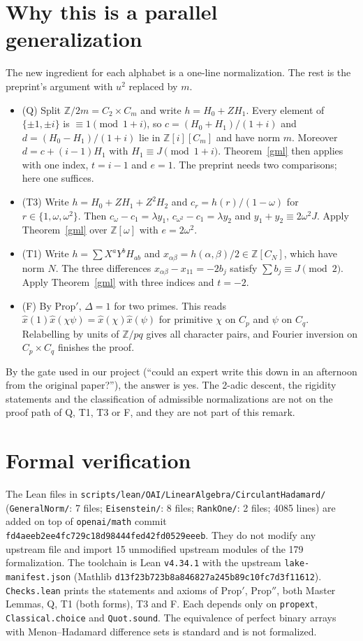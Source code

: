 \documentclass[11pt]{amsart}
\theoremstyle{remark}
\newcommand{\Z}{\mathbb{Z}}
\begin{document}
\section{Why this is a parallel generalization}
The new ingredient for each alphabet is a one-line normalization. The rest is the
preprint's argument with $u^2$ replaced by $m$.
\begin{itemize}
\item (Q) Split $\Z/2m=C_2\times C_m$ and write $h=H_0+ZH_1$. Every element of
$\{\pm1,\pm i\}$ is $\equiv1\pmod{1+i}$, so $c=(H_0+H_1)/(1+i)$ and
$d=(H_0-H_1)/(1+i)$ lie in $\Z[i][C_m]$ and have norm $m$. Moreover $d=c+(i-1)H_1$ with
$H_1\equiv J\pmod{1+i}$. Theorem~\ref{gml} then applies with one index, $t=i-1$ and $e=1$. The
preprint needs two comparisons; here one suffices.
\item (T3) Write $h=H_0+ZH_1+Z^2H_2$ and $c_r=h(r)/(1-\omega)$ for $r\in\{1,\omega,\omega^2\}$.
Then $c_\omega-c_1=\lambda y_1$, $c_{\omega^2}-c_1=\lambda y_2$ and $y_1+y_2\equiv2\omega^2J$.
Apply Theorem~\ref{gml} over $\Z[\omega]$ with $e=2\omega^2$.
\item (T1) Write $h=\sum X^aY^bH_{ab}$ and $x_{\alpha\beta}=h(\alpha,\beta)/2\in\Z[C_N]$, which have norm $N$.
The three differences $x_{\alpha\beta}-x_{11}=-2b_j$ satisfy $\sum b_j\equiv J\pmod 2$.
Apply Theorem~\ref{gml} with three indices and $t=-2$.
\item (F) By Prop$'$, $\Delta=1$ for two primes. This reads
$\hat x(1)\hat x(\chi\psi)=\hat x(\chi)\hat x(\psi)$ for primitive $\chi$ on $C_p$ and $\psi$ on $C_q$.
Relabelling by units of $\Z/pq$ gives all character pairs, and Fourier inversion on
$C_p\times C_q$ finishes the proof.
\end{itemize}
By the gate used in our project (``could an expert write this down in an afternoon
from the original paper?''), the answer is yes. The 2-adic descent, the rigidity statements and the
classification of admissible normalizations are not on the proof path of Q, T1, T3
or F, and they are not part of this remark.

\section{Formal verification}
The Lean files in \texttt{scripts/lean/OAI/LinearAlgebra/CirculantHadamard/}
(\texttt{GeneralNorm/}: 7 files; \texttt{Eisenstein/}: 8 files; \texttt{RankOne/}: 2 files;
4085 lines) are added on top of \texttt{openai/math} commit
\texttt{fd4aeeb2ee4fc729c18d98444fed42fd0529eeeb}. They do not modify any upstream file
and import 15 unmodified upstream modules of the 179 formalization. The toolchain is Lean
\texttt{v4.34.1} with the upstream \texttt{lake-manifest.json} (Mathlib
\texttt{d13f23b723b8a846827a245b89c10fc7d3f11612}). \texttt{Checks.lean} prints the
statements and axioms of Prop$'$, Prop$''$, both Master Lemmas, Q, T1 (both forms),
T3 and F. Each depends only on \texttt{propext}, \texttt{Classical.choice} and
\texttt{Quot.sound}. The equivalence of perfect binary arrays with Menon--Hadamard
difference sets is standard and is not formalized.
\end{document}
